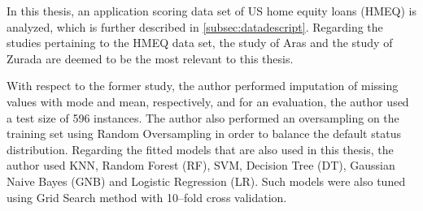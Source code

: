 In this thesis, an application scoring data set of US home equity loans (HMEQ) is analyzed, which is further described in \autoref{subsec:datadescript}.
Regarding the studies pertaining to the HMEQ data set, the study of Aras \citep{serkan2021bagging} and the study of Zurada \citep{zurada2014classification} are deemed to be the most relevant to this thesis.



With respect to the former study, the author performed imputation of missing values with mode and mean, respectively, and for an evaluation, the author used a test size of 596 instances.
The author also performed an oversampling on the training set using Random Oversampling in order to balance the default status distribution.
Regarding the fitted models that are also used in this thesis, the author used KNN, Random Forest (RF), SVM, Decision Tree (DT), Gaussian Naive Bayes (GNB) and Logistic Regression (LR).
Such models were also tuned using Grid Search method with 10--fold cross validation.


